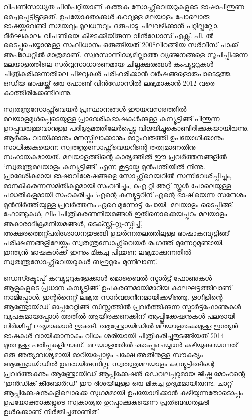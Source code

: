 \documentclass[12pt,twoside,a4paper]{article}
\begin{document}
വിപണിസാധ്യത പിൻപറ്റിയാണ് കുത്തക സോഫ്റ്റ്‌വെയറുകളുടെ ഭാഷാപിന്തുണ മെച്ചപ്പെട്ടിട്ടുള്ളത്. ഉപയോക്താക്കൾ കുറവുള്ള മലയാളം പോലൊരു ഭാഷയ്ക്കുവേണ്ടി സമയവും മൂലധനവും ഒരുപാടു ചിലവഴിക്കാൻ പറ്റില്ലല്ലോ. ദീർഘകാലം വിപണിയെ കീഴടക്കിയിരുന്ന വിൻഡോസ് എക്സ്. പി. ൽ  ടൈപ്പുചെയ്യാനുള്ള സംവിധാനം ഒരുങ്ങിയത് 2008ലിറങ്ങിയ സർവീസ് പാക്ക് അപ്ഡേറ്റിൽ മാത്രമാണ്. സ്വരസാന്നിദ്ധ്യമില്ലാത്ത വ്യഞ്ജനങ്ങളെ സൂചിപ്പിക്കുന്ന മലയാളത്തിലെ സർവ്വസാധാരണമായ ചില്ലക്ഷരങ്ങൾ കംപ്യൂട്ടറുകൾ ചിത്രീകരിക്കുന്നതിലെ പിഴവുകൾ പരിഹരിക്കാൻ വർഷങ്ങളൊരുപാടെടുത്തു. ഒഡിയ ഭാഷയ്ക്ക് ഒരു ഫോണ്ട് വിൻഡോസിൽ ലഭ്യമാകാൻ 2012 വരെ കാത്തിരിക്കേണ്ടിവന്നു.

സ്വതന്ത്രസോഫ്റ്റ്‌വെയർ പ്രസ്ഥാനങ്ങൾ ഈയവസരത്തിൽ മലയാളമുൾപ്പെടെയുള്ള പ്രാദേശികഭാഷകൾക്കുള്ള കമ്പ്യൂട്ടിങ്ങ് പിന്തുണ ഉറപ്പുവരുത്തുവാനുള്ള പരിശ്രമത്തിലേർപ്പെട്ടു വിജയിച്ചുകൊണ്ടിരിക്കുകയായിരുന്നു. ആർക്കും വായിക്കാനും മനസ്സിലാക്കാനും മാറ്റംവരുത്തി ഉപയോഗിക്കാനും സാധിക്കുകയെന്ന സ്വതന്ത്രസോഫ്റ്റ്‌വെയറിന്റെ തത്വമാണതിനു സഹായകമായത്. മലയാളത്തിന്റെ കാര്യത്തിൽ ഈ പ്രവർത്തനങ്ങളിൽ `സ്വതന്ത്രമലയാളം കമ്പ്യൂട്ടിങ്ങ്' എന്ന കൂട്ടായ്മ മുൻപന്തിയിൽ നിന്നു. പ്രാദേശികമായ ഭാഷാവിശേഷങ്ങളെ സോഫ്റ്റ്‌വെയറിൽ സന്നിവേശിപ്പിച്ചും, മാനകീകരണസമിതികളുമായി സംവദിച്ചും, ഐ.റ്റി അറ്റ് സ്കൂൾ പോലെയുള്ള പദ്ധതികളുമായി സഹകരിച്ചും  `എന്റെ കമ്പ്യൂട്ടറിന് എന്റെ ഭാഷ'യെന്ന സന്ദേശം മുൻനിർത്തിയുള്ള പ്രവർത്തനം ഏറെ മുന്നോട്ട് പോയി. മലയാളം ടൈപ്പിങ്ങ്, ഫോണ്ടുകൾ, ലിപിചിത്രീകരണനിയമങ്ങൾ ഇതിനൊക്കെയപ്പുറം മലയാളം അകാരാദിക്രമനിയമങ്ങൾ, ടെക്സ്റ്റ്-റ്റു-സ്പീച്ച്, അക്ഷരത്തെറ്റ്പരിശോധനതുടങ്ങി ഉയർന്നതലത്തിലുള്ള ഭാഷാകമ്പ്യൂട്ടിങ്ങ് പരീക്ഷണങ്ങളിലേയ്ക്കും സ്വതന്ത്രസോഫ്റ്റ്‌വെയർ രംഗത്ത് മുന്നേറ്റമുണ്ടായി. ഇന്ത്യൻ ഭാഷകൾക്ക് ഇന്നും മികച്ച പിന്തുണ ലഭ്യമാക്കുന്നതിൽ സ്വതന്ത്രസോഫ്റ്റ്‌വെയറുകൾ ബഹുദൂരം മുന്നിലാണ്.

ഡെസ്ക്ടോപ്പ് കമ്പ്യൂട്ടറുകളേക്കാൾ മൊബൈൽ സ്മാർട്ട് ഫോണുകൾ ആളുകളുടെ പ്രധാന കമ്പ്യൂട്ടിങ്ങ് ഉപകരണമായിമാറിയ കാലഘട്ടത്തിലാണ് നാമിപ്പോൾ. ഇന്റർനെറ്റ് ലഭ്യത സാർവജനീനമായിക്കഴിഞ്ഞു. ഗൂഗിളിന്റെ ആണ്ട്രോയിഡ് ഓപ്പറേറ്റിങ്ങ് സിസ്റ്റത്തിൽ പ്രവർത്തിക്കുന്ന സ്മാർട്ട്ഫോണുകൾ വ്യപകമായപ്പോൾ അതിൽ ആയിരക്കണക്കിന് ആപ്പ്ലിക്കേഷനുകൾ പലരായി നിർമ്മിച്ച് ലഭ്യമാക്കാൻ തുടങ്ങി. ആണ്ട്രോയിഡിൽ മലയാളമടക്കമുള്ള ഇന്ത്യൻ ഭാഷകൾ വായിക്കാനാകും വിധം ശരിയായി ചിത്രീകരിച്ചുതുടങ്ങിയത് 2014 മുതലുള്ള പതിപ്പുകളിലാണ്. മലയാളത്തിൽ ടൈപ്പുചെയ്യാൻ കഴിയുകയെന്നത് ഒരു അത്യാവശ്യമായി മാറിയപ്പോഴും പക്ഷേ അതിനുള്ള സൗകര്യം ആണ്ട്രോയിഡിൽ ഉണ്ടായിരുന്നില്ല. സ്വതന്ത്രമലയാളം കമ്പ്യൂട്ടിങ്ങിന്റെ പ്രവർത്തകനും ആണ്ട്രോയിഡ് ആപ്ലിക്കേഷൻ ഡെവലപ്പറുമായ ജിഷ്ണു മോഹന്റെ `ഇൻഡിക് കീബോർഡ്' ഈ ദിശയിലുള്ള ഒരു  മികച്ച ഉദ്യമമായിരുന്നു. ചാറ്റ് ആപ്ലിക്കേഷനുകളിലൊക്കെ സുഗമമായി ഉപയോഗിക്കാൻ കഴിയുന്നതോടൊപ്പം ഉപയോക്താക്കളുടെ സ്വകാര്യത ഉറപ്പാക്കുകയെന്ന പ്രതിബദ്ധതകൂടി ഉൾക്കൊണ്ട് നിർമ്മിച്ചതാണിത്.
\end{document}

